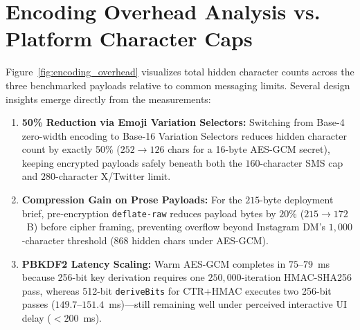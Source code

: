 \documentclass[12pt,a4paper,oneside,openany]{report}
\begin{document}
\section{Encoding Overhead Analysis vs. Platform Character Caps}
Figure~\ref{fig:encoding_overhead} visualizes total hidden character counts across the three benchmarked payloads relative to common messaging limits. Several design insights emerge directly from the measurements:
\begin{enumerate}
    \item \textbf{50\% Reduction via Emoji Variation Selectors:} Switching from Base-4 zero-width encoding to Base-16 Variation Selectors reduces hidden character count by exactly 50\% ($252 \rightarrow 126$ chars for a 16-byte AES-GCM secret), keeping encrypted payloads safely beneath both the $160$-character SMS cap and $280$-character X/Twitter limit.
    \item \textbf{Compression Gain on Prose Payloads:} For the $215$-byte deployment brief, pre-encryption \texttt{deflate-raw} reduces payload bytes by $20\%$ ($215 \rightarrow 172$~B) before cipher framing, preventing overflow beyond Instagram DM's $1{,}000$-character threshold ($868$ hidden chars under AES-GCM).
    \item \textbf{PBKDF2 Latency Scaling:} Warm AES-GCM completes in $75$--$79$~ms because 256-bit key derivation requires one $250{,}000$-iteration HMAC-SHA256 pass, whereas 512-bit \texttt{deriveBits} for CTR+HMAC executes two 256-bit passes ($149.7$--$151.4$~ms)---still remaining well under perceived interactive UI delay ($<200$~ms).
\end{enumerate}
\end{document}
